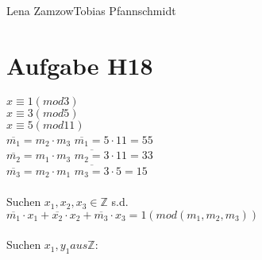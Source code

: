\documentclass[11pt,a4paper]{article}
\begin{document}
                {Lena Zamzow}{Tobias Pfannschmidt}{}{}{}


\section*{Aufgabe H18}
$x\equiv1(mod 3)$\\
$x\equiv3(mod 5)$\\
$x\equiv5 (mod 11)$\\
$\overline{m_1}=m_2\cdot m_3$   $\overline{m_1} = 5 \cdot 11 = 55$\\
$\overline{m_2}=m_1\cdot m_3$   $\overline{m_2 = 3} \cdot 11 = 33$\\
$\overline{m_3}=m_2\cdot m_1$   $\overline{m_3 = 3} \cdot 5 = 15$\\
\\
Suchen $x_1, x_2, x_3 \in \mathbb{Z}$ s.d.\\
$\overline{m_1}\cdot x_1 + \overline{x_2} \cdot x_2 + \overline{m_3} \cdot x_3 = 1(mod(m_1,m_2,m_3))$\\
\\
Suchen $x_1,y_1 aus \mathbb{Z}:$\\
\end{document}
